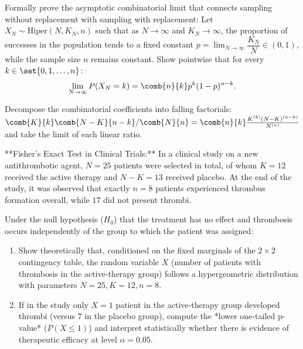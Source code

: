 \begin{problema}
	\label{prob:3.6.9}
	Formally prove the asymptotic combinatorial limit that connects sampling without replacement with sampling with replacement:
	Let $X_N \sim \text{Hiper}(N, K_N, n)$ such that as $N \to \infty$ and $K_N \to \infty$, the proportion of successes in the population tends to a fixed constant $p = \lim_{N \to \infty} \dfrac{K_N}{N} \in (0, 1)$, while the sample size $n$ remains constant. Show pointwise that for every $k \in \set{0, 1, \dots, n}$:
	\begin{align*}
		\lim_{N \to \infty} P(X_N = k) = \comb{n}{k} p^k (1-p)^{n-k}.
	\end{align*}
\end{problema}

\begin{sugerencia}
	Decompose the combinatorial coefficients into falling factorials: $\comb{K}{k}\comb{N-K}{n-k}/\comb{N}{n} = \comb{n}{k} \frac{K^{(k)} (N-K)^{(n-k)}}{N^{(n)}}$ and take the limit of each linear ratio.
\end{sugerencia}

\begin{problema}
	\label{prob:3.6.10}
	**Fisher's Exact Test in Clinical Trials:**
	In a clinical study on a new antithrombotic agent, $N=25$ patients were selected in total, of whom $K=12$ received the active therapy and $N-K=13$ received placebo. At the end of the study, it was observed that exactly $n=8$ patients experienced thrombus formation overall, while $17$ did not present thrombi.

	Under the null hypothesis ($H_0$) that the treatment has no effect and thrombosis occurs independently of the group to which the patient was assigned:
	\begin{enumerate}
		\item Show theoretically that, conditioned on the fixed marginals of the $2 \times 2$ contingency table, the random variable $X$ (number of patients with thrombosis in the active-therapy group) follows a hypergeometric distribution with parameters $N=25, K=12, n=8$.
		\item If in the study only $X = 1$ patient in the active-therapy group developed thrombi (versus $7$ in the placebo group), compute the *lower one-tailed p-value* ($P(X \le 1)$) and interpret statistically whether there is evidence of therapeutic efficacy at level $\alpha = 0.05$.
	\end{enumerate}
\end{problema}

